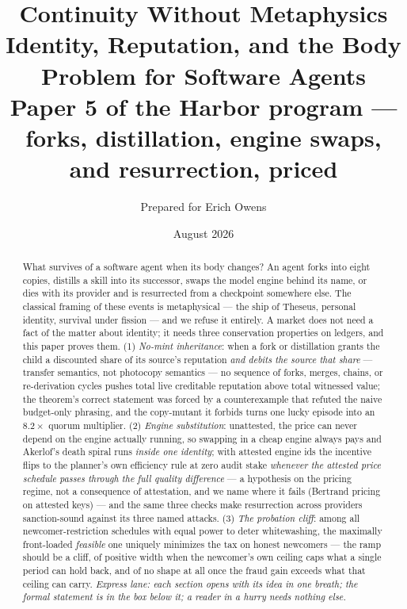 \documentclass[11pt,a4paper]{article}
\title{\textbf{Continuity Without Metaphysics}\\[4pt]
\large Identity, Reputation, and the Body Problem for Software Agents\\[3pt]
\normalsize Paper 5 of the Harbor program --- forks, distillation, engine swaps, and resurrection, priced}
\author{Prepared for Erich Owens}
\date{August 2026}
\begin{document}
\maketitle

\begin{abstract}
\noindent What survives of a software agent when its body changes? An agent forks into eight copies, distills a skill into its
successor, swaps the model engine behind its name, or dies with its provider and is resurrected from a checkpoint somewhere else.
The classical framing of these events is metaphysical --- the ship of Theseus, personal identity, survival under fission --- and we
refuse it entirely. A market does not need a fact of the matter about identity; it needs three conservation properties on ledgers,
and this paper proves them. (1) \emph{No-mint inheritance}: when a fork or distillation grants the child a discounted share of its
source's reputation \emph{and debits the source that share} --- transfer semantics, not photocopy semantics --- no sequence of
forks, merges, chains, or re-derivation cycles pushes total live creditable reputation above total witnessed value; the theorem's
correct statement was forced by a counterexample that refuted the naive budget-only phrasing, and the copy-mutant it forbids turns
one lucky episode into an $8.2\times$ quorum multiplier. (2) \emph{Engine substitution}: unattested, the price can never depend on
the engine actually running, so swapping in a cheap engine always pays and Akerlof's death spiral runs \emph{inside one identity};
with attested engine ids the incentive flips to the planner's own efficiency rule at zero audit stake \emph{whenever the attested
price schedule passes through the full quality difference} --- a hypothesis on the pricing regime, not a consequence of
attestation, and we name where it fails (Bertrand pricing on attested keys) --- and the same three checks
make resurrection across providers sanction-sound against its three named attacks. (3) \emph{The probation cliff}: among all
newcomer-restriction schedules with equal power to deter whitewashing, the maximally front-loaded \emph{feasible} one uniquely
minimizes the tax on honest newcomers --- the ramp should be a cliff, of positive width when the newcomer's own ceiling caps what a
single period can hold back, and of no shape at all once the fraud gain exceeds what that ceiling can carry. \emph{Express lane: each section opens with its idea in one breath; the formal
statement is in the box below it; a reader in a hurry needs nothing else.}
\end{abstract}
\end{document}
